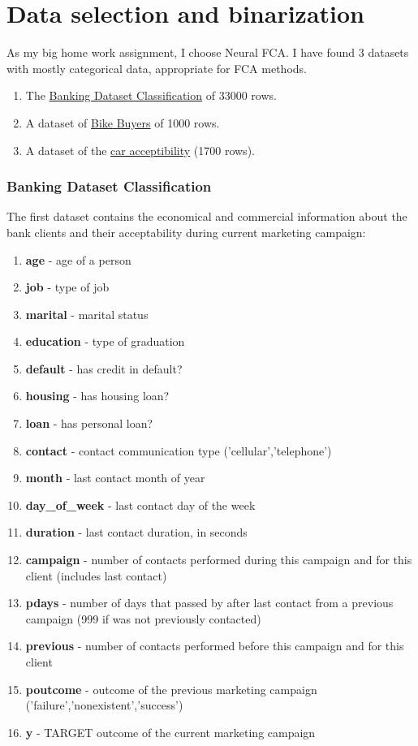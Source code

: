 \section{Data selection and binarization}

As my big home work assignment, I choose Neural FCA.
I have found 3 datasets with mostly categorical data, appropriate for FCA methods.

\begin{enumerate}
\item The \href{https://www.kaggle.com/datasets/rashmiranu/banking-dataset-classification}{Banking Dataset Classification} of 33000 rows.
\item A dataset of \href{https://www.kaggle.com/datasets/heeraldedhia/bike-buyers}{Bike Buyers} of 1000 rows.
\item A dataset of the \href{https://www.kaggle.com/datasets/subhajeetdas/car-acceptability-classification-dataset}{car acceptibility} (1700 rows).
\end{enumerate}

\subsubsection{Banking Dataset Classification}

The first dataset contains the economical and commercial information about the bank clients and their acceptability during current marketing campaign:

\begin{enumerate}
\item \textbf{age} - age of a person
\item \textbf{job} - type of job
\item \textbf{marital} - marital status
\item \textbf{education} - type of graduation
\item \textbf{default} - has credit in default?
\item \textbf{housing} - has housing loan?
\item \textbf{loan} - has personal loan?
\item \textbf{contact} - contact communication type ('cellular','telephone')
\item \textbf{month} - last contact month of year 
\item \textbf{day\_of\_week} - last contact day of the week
\item \textbf{duration} - last contact duration, in seconds
\item \textbf{campaign} - number of contacts performed during this campaign and for this client (includes last contact)
\item \textbf{pdays} - number of days that passed by after last contact from a previous campaign (999 if was not previously contacted)
\item \textbf{previous} -  number of contacts performed before this campaign and for this client
\item \textbf{poutcome} - outcome of the previous marketing campaign ('failure','nonexistent','success')
\item \textbf{y} - TARGET outcome of the current marketing campaign
\end{enumerate}

